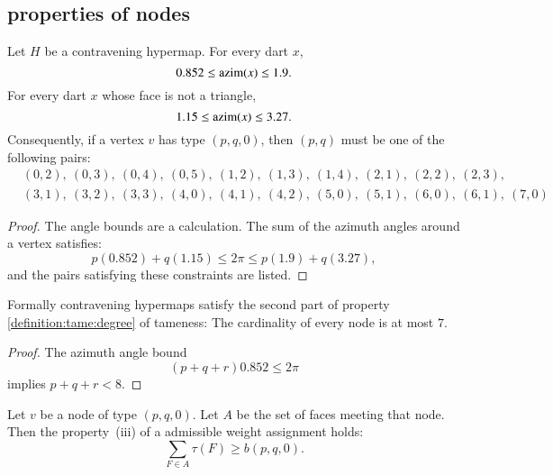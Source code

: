 \subsection{properties of nodes}



\begin{lemma} \label{lemma:0.852}
Let $H$ be a contravening
hypermap. For every dart $x$,
    $$0.852\le {\operatorname{azim}}(x)\le 1.9.$$
For every dart $x$ whose face is not a triangle, 
    $$1.15\le{\operatorname{azim}}(x)\le 3.27.$$
Consequently, if a vertex $v$ has type $(p,q,0)$, then $(p,q)$
must be one of the following pairs:
$$
\begin{array}{lll}
&(0,2),~(0,3),~(0,4),~(0,5),~(1,2),~(1,3),~(1,4),~(2,1),~(2,2),~(2,3),\\
&(3,1),~(3,2),~(3,3),~(4,0),~(4,1),~(4,2),~(5,0),~(5,1),~(6,0),~(6,1),~(7,0)
\end{array}
$$
\end{lemma}
 
\begin{proof}
The angle bounds are a calculation.  The sum of the azimuth angles
around a vertex satisfies:
$$
  p (0.852) + q (1.15) \le 2\pi \le p (1.9) + q (3.27),
$$
and the pairs satisfying these constraints are listed.
\end{proof}

\begin{lemma}
Formally contravening hypermaps satisfy the second part of property
\ref{definition:tame:degree} of tameness: The cardinality of every
node is at most $7$.
\end{lemma}

\begin{proof}  The azimuth angle bound
$$
 (p+q+r) 0.852 \le 2\pi
$$
implies $p+q+r < 8$.
\end{proof}




\begin{lemma} 
Let $v$ be a node of type $(p,q,0)$.  Let $A$ be the set of faces meeting that node.  Then the property~(iii) of a admissible weight assignment holds:
$$
\sum_{F\in A} \tau(F) \ge  b(p,q,0).
$$
\end{lemma}

